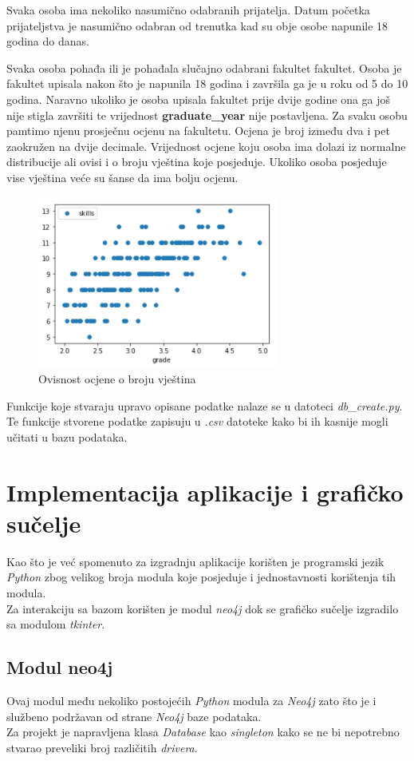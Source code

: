 \documentclass[titlepage, 12pt]{scrartcl}
\begin{document}
Svaka osoba ima nekoliko nasumično odabranih prijatelja. Datum početka prijateljstva je nasumično odabran od trenutka kad su obje osobe napunile 18 godina do danas.

Svaka osoba pohađa ili je pohađala slučajno odabrani fakultet fakultet. Osoba je fakultet upisala nakon što je napunila 18 godina i završila ga je u roku od 5 do 10 godina. Naravno ukoliko je osoba upisala fakultet prije dvije godine ona ga još nije stigla završiti te vrijednost \textbf{graduate\_year} nije postavljena.
Za svaku osobu pamtimo njenu prosječnu ocjenu na fakultetu. Ocjena je broj između dva i pet zaokružen na dvije decimale. Vrijednost ocjene koju osoba ima dolazi iz normalne distribucije ali ovisi i o broju vještina koje posjeduje. Ukoliko osoba posjeduje vise vještina veće su šanse da ima bolju ocjenu.
\begin{figure}
    \centering
    \includegraphics{slike/Grades.png}
    \caption{Ovisnost ocjene o broju vještina}
    \label{fig:hobbies}
\end{figure}

Funkcije koje stvaraju upravo opisane podatke nalaze se u datoteci \emph{db\_create.py}. 
Te funkcije stvorene podatke zapisuju u \emph{.csv} datoteke kako bi ih kasnije mogli učitati u bazu podataka.  
\newpage

\section{Implementacija aplikacije i grafičko sučelje}
Kao što je već spomenuto za izgradnju aplikacije korišten je programski jezik \emph{Python} zbog velikog broja modula koje posjeduje i jednostavnosti korištenja tih modula. \\
Za interakciju sa bazom korišten je modul \emph{neo4j} dok se grafičko sučelje izgradilo sa modulom \emph{tkinter}.
\subsection{Modul neo4j}
Ovaj modul među nekoliko postojećih \emph{Python} modula za \emph{Neo4j} zato što je i službeno podržavan od strane \emph{Neo4j} baze podataka. \\
Za projekt je napravljena klasa \emph{Database} kao \emph{singleton} kako se ne bi nepotrebno stvarao preveliki broj različitih \emph{drivera}.
\end{document}
